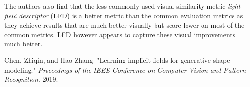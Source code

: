 \documentclass[12pt]{article}
\begin{document}
The authors also find that the less commonly used visual similarity metric \emph{light field descriptor} (LFD) is a better metric than the common evaluation metrics as they achieve results that are much better visually but score lower on most of the common metrics. LFD however appears to capture these visual improvements much better.

\begin{thebibliography}{9}
Chen, Zhiqin, and Hao Zhang. "Learning implicit fields for generative shape modeling." \emph{Proceedings of the IEEE Conference on Computer Vision and Pattern Recognition}. 2019.

\end{thebibliography}
 
\end{document}
